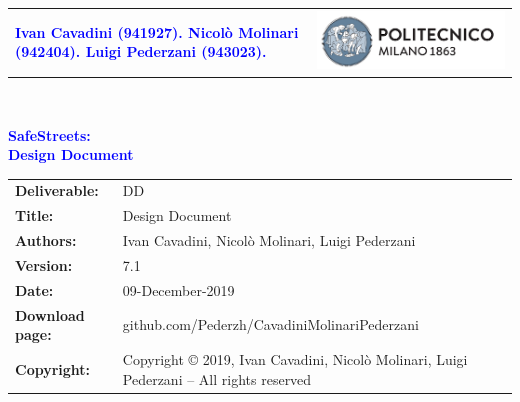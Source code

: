 




\begin{titlepage}



{\begin{table}[t!]
\centering
\begin{tabu} to \textwidth { X[1.3,r,p] X[1.7,l,p] }
\textcolor{Blue}
{\textbf{Ivan Cavadini (941927). Nicolò Molinari (942404).  Luigi Pederzani (943023).}} & \includegraphics[scale=0.5]{Images/PolimiLogo}
\end{tabu}
\end{table}}~\\ [7cm]


\begin{flushleft}

{\textcolor{Blue}{\textbf{\Huge{SafeStreets: \\ \vspace{0.5cm} Design Document}}}} \\ [1cm]

\end{flushleft}

\end{titlepage}

\begin{table}[h!]
\begin{tabu} to \textwidth { X[0.3,r,p] X[0.7,l,p] }
\hline

\textbf{Deliverable:} & DD\\
\textbf{Title:} & Design Document \\
\textbf{Authors:} & Ivan Cavadini, Nicolò Molinari, Luigi Pederzani \\
\textbf{Version:} & 7.1 \\ 
\textbf{Date:} & 09-December-2019 \\
\textbf{Download page:} & github.com/Pederzh/CavadiniMolinariPederzani \\
\textbf{Copyright:} & Copyright © 2019, Ivan Cavadini, Nicolò Molinari, Luigi Pederzani – All rights reserved \\
\hline
\end{tabu}
\end{table}




